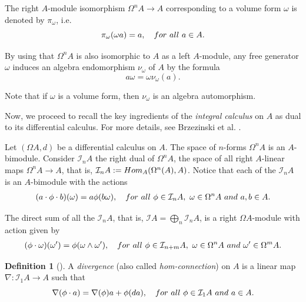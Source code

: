 \documentclass{amsart}
\theoremstyle{definition}
\newtheorem{definition}[theorem]{Definition}
\theoremstyle{remark}
\numberwithin{equation}{section}
\begin{document}
The right $A$-module isomorphism $\Omega^n A \to A$ corresponding to a volume form $\omega$ is denoted by $\pi_{\omega}$, i.e.
\begin{equation}\label{BrzezinskiSitarz2017(2.1)}
\pi_{\omega} (\omega a) = a, \quad {\rm for\ all}\ a\in A.
\end{equation}

By using that $\Omega^n A$ is also isomorphic to $A$ as a left $A$-module, any free generator $\omega $ induces an algebra endomorphism $\nu_{\omega}$ of $A$ by the formula
\begin{equation}\label{BrzezinskiSitarz2017(2.2)}
    a \omega = \omega \nu_{\omega} (a).
\end{equation}

Note that if $\omega$ is a volume form, then $\nu_{\omega}$ is an algebra automorphism.

Now, we proceed to recall the key ingredients of the {\em integral calculus} on $A$ as dual to its differential calculus. For more details, see Brzezinski et al. \cite{Brzezinski2008, BrzezinskiElKaoutitLomp2010}.

Let $(\Omega A, d)$ be a differential calculus on $A$. The space of $n$-forms $\Omega^n A$ is an $A$-bimodule. Consider $\mathcal{I}_{n}A$ the right dual of $\Omega^{n}A$, the space of all right $A$-linear maps $\Omega^{n}A\rightarrow A$, that is, $\mathcal{I}_{n}A := {\rm Hom}_{A}(\Omega^{n}(A),A)$. Notice that each of the $\mathcal{I}_{n}A$ is an $A$-bimodule with the actions
\begin{align*}
    (a\cdot\phi\cdot b)(\omega)=a\phi(b\omega),\quad {\rm for\ all}\ \phi \in \mathcal{I}_{n}A,\ \omega \in \Omega^{n}A\ {\rm and}\ a,b \in A.
\end{align*}

The direct sum of all the $\mathcal{I}_{n}A$, that is, $\mathcal{I}A = \bigoplus\limits_{n} \mathcal{I}_n A$, is a right $\Omega A$-module with action given by
\begin{align}\label{BrzezinskiSitarz2017(2.3)}
    (\phi\cdot\omega)(\omega')=\phi(\omega\wedge\omega'),\quad {\rm for\ all}\ \phi\in\mathcal{I}_{n + m}A, \ \omega\in \Omega^{n}A \ {\rm and} \ \omega' \in \Omega^{m}A.
\end{align}

\begin{definition}[{\cite[Definition 2.1]{Brzezinski2008}}]
A {\em divergence} (also called {\em hom-connection}) on $A$ is a linear map $\nabla: \mathcal{I}_1 A \to A$ such that
\begin{equation}\label{BrzezinskiSitarz2017(2.4)}
    \nabla(\phi \cdot a) = \nabla(\phi) a + \phi(da), \quad {\rm for\ all}\ \phi \in \mathcal{I}_1 A \ {\rm and} \ a \in A.
\end{equation}  
\end{definition}
\end{document}
